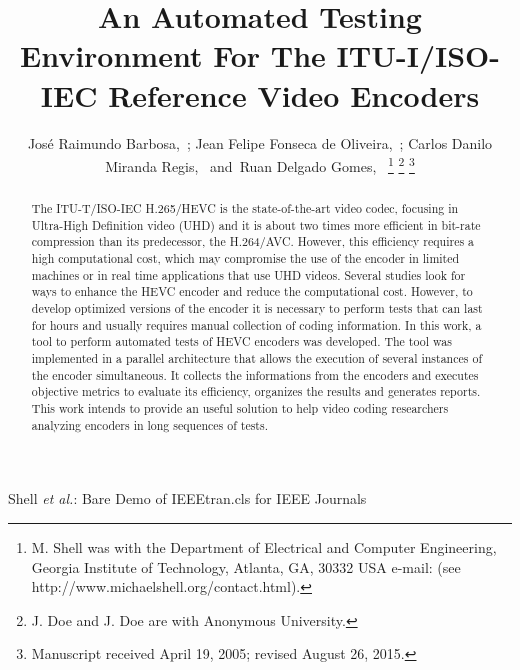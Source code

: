 \documentclass[journal]{IEEEtran}
\begin{document}
%

\title{An Automated Testing Environment For The ITU-I/ISO-IEC Reference Video Encoders}
%

\author{José Raimundo Barbosa,~;
        Jean Felipe Fonseca de Oliveira,~;
        Carlos Danilo Miranda Regis,~
        and~Ruan Delgado Gomes,~%
\thanks{M. Shell was with the Department
of Electrical and Computer Engineering, Georgia Institute of Technology, Atlanta,
GA, 30332 USA e-mail: (see http://www.michaelshell.org/contact.html).}%
\thanks{J. Doe and J. Doe are with Anonymous University.}%
\thanks{Manuscript received April 19, 2005; revised August 26, 2015.}}

%
{Shell \MakeLowercase{\textit{et al.}}: Bare Demo of IEEEtran.cls for IEEE Journals}

\maketitle

\begin{abstract}
The ITU-T/ISO-IEC H.265/HEVC is the state-of-the-art video codec, focusing in Ultra-High Definition video (UHD) and it is about two times more efficient in bit-rate compression than its predecessor, the H.264/AVC. However, this efficiency requires a high computational cost, which may compromise the use of the encoder in limited machines or in real time applications that use UHD videos. Several studies look for ways to enhance the HEVC encoder and reduce the computational cost. However, to develop optimized versions of the encoder it is necessary to perform tests that can last for hours and usually requires manual collection of coding information.  In this work, a tool to perform automated tests of HEVC encoders  was developed. The tool was implemented in a parallel architecture that allows the execution of several instances of the encoder simultaneous. It collects the informations from the encoders and executes objective metrics to evaluate its efficiency, organizes the results and generates reports. This work intends to provide an useful solution to help video coding researchers analyzing encoders in long sequences of tests.
\end{abstract}
\end{document}
